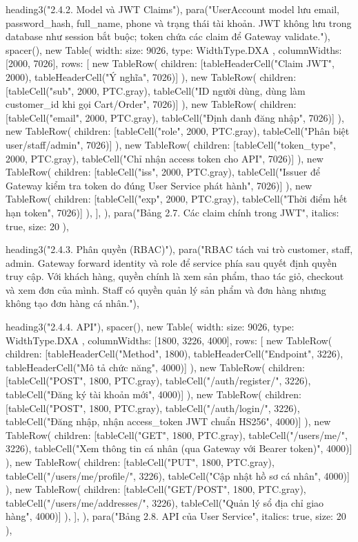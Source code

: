   heading3("2.4.2. Model và JWT Claims"),
  para("UserAccount model lưu email, password_hash, full_name, phone và trạng thái tài khoản. JWT không lưu trong database như session bắt buộc; token chứa các claim để Gateway validate."),
  spacer(),
  new Table({
    width: { size: 9026, type: WidthType.DXA },
    columnWidths: [2000, 7026],
    rows: [
      new TableRow({ children: [tableHeaderCell("Claim JWT", 2000), tableHeaderCell("Ý nghĩa", 7026)] }),
      new TableRow({ children: [tableCell("sub", 2000, PTC.gray), tableCell("ID người dùng, dùng làm customer_id khi gọi Cart/Order", 7026)] }),
      new TableRow({ children: [tableCell("email", 2000, PTC.gray), tableCell("Định danh đăng nhập", 7026)] }),
      new TableRow({ children: [tableCell("role", 2000, PTC.gray), tableCell("Phân biệt user/staff/admin", 7026)] }),
      new TableRow({ children: [tableCell("token_type", 2000, PTC.gray), tableCell("Chỉ nhận access token cho API", 7026)] }),
      new TableRow({ children: [tableCell("iss", 2000, PTC.gray), tableCell("Issuer để Gateway kiểm tra token do đúng User Service phát hành", 7026)] }),
      new TableRow({ children: [tableCell("exp", 2000, PTC.gray), tableCell("Thời điểm hết hạn token", 7026)] }),
    ],
  }),
  para("Bảng 2.7. Các claim chính trong JWT", { italics: true, size: 20 }),

  heading3("2.4.3. Phân quyền (RBAC)"),
  para("RBAC tách vai trò customer, staff, admin. Gateway forward identity và role để service phía sau quyết định quyền truy cập. Với khách hàng, quyền chính là xem sản phẩm, thao tác giỏ, checkout và xem đơn của mình. Staff có quyền quản lý sản phẩm và đơn hàng nhưng không tạo đơn hàng cá nhân."),

  heading3("2.4.4. API"),
  spacer(),
  new Table({
    width: { size: 9026, type: WidthType.DXA },
    columnWidths: [1800, 3226, 4000],
    rows: [
      new TableRow({ children: [tableHeaderCell("Method", 1800), tableHeaderCell("Endpoint", 3226), tableHeaderCell("Mô tả chức năng", 4000)] }),
      new TableRow({ children: [tableCell("POST", 1800, PTC.gray), tableCell("/auth/register/", 3226), tableCell("Đăng ký tài khoản mới", 4000)] }),
      new TableRow({ children: [tableCell("POST", 1800, PTC.gray), tableCell("/auth/login/", 3226), tableCell("Đăng nhập, nhận access_token JWT chuẩn HS256", 4000)] }),
      new TableRow({ children: [tableCell("GET", 1800, PTC.gray), tableCell("/users/me/", 3226), tableCell("Xem thông tin cá nhân (qua Gateway với Bearer token)", 4000)] }),
      new TableRow({ children: [tableCell("PUT", 1800, PTC.gray), tableCell("/users/me/profile/", 3226), tableCell("Cập nhật hồ sơ cá nhân", 4000)] }),
      new TableRow({ children: [tableCell("GET/POST", 1800, PTC.gray), tableCell("/users/me/addresses/", 3226), tableCell("Quản lý sổ địa chỉ giao hàng", 4000)] }),
    ],
  }),
  para("Bảng 2.8. API của User Service", { italics: true, size: 20 }),

